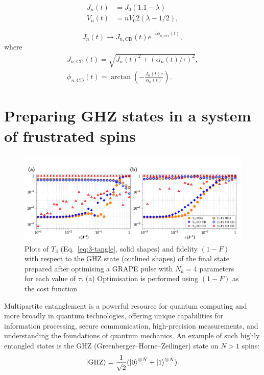 \begin{align} \label{eq:J_lattice}
    J_n(t) &= J_0(1.1 - \lambda) \\ \label{eq:V_lattice}
    V_n(t) &= n V_0 2 (\lambda - 1/2),
\end{align}

\begin{equation}\label{eq:tunneling}
    J_n(t) \rightarrow J_{n, \mathrm{CD}}(t) e^{-i\phi_{n, \mathrm{CD}}(t)},
\end{equation}
where
\begin{align}\label{eq:J_cd}
    J_{n, \mathrm{CD}}(t) = \sqrt{J_n(t)^2 + (\alpha_n(t)/\tau)^2}, \\ \label{eq:phi_cd}
    \phi_{n, \mathrm{CD}}(t)  = \arctan\left(-\frac{J_n(t)\tau}{\alpha_n(t)}\right),
\end{align}

\section{Preparing GHZ states in a system of frustrated spins}\label{sec:6.4_ghz_states}

\begin{figure}[t]
    \centering
    \includegraphics[width=\linewidth]{images/tangle_plots.jpg} \caption[Plots of entanglement and fidelity of GHZ states]{Plots of $T_3$ (Eq.~\eqref{eq:3-tangle}, solid shapes) and fidelity $(1 - F)$ with respect to the GHZ state (outlined shapes) of the final state prepared after optimising a GRAPE pulse with $N_k = 4$ parameters for each value of $\tau$.  (a) Optimisation is performed using $(1 - F)$ as the cost function}\label{fig:tangle_v_fidelity}
\end{figure}

Multipartite entanglement is a powerful resource for quantum computing and more broadly in quantum technologies, offering unique capabilities for information processing, secure communication, high-precision measurements, and understanding the foundations of quantum mechanics. An example of such highly entangled states is the GHZ (Greenberger–Horne–Zeilinger) state \cite{greenberger_bells_1990} on $N > 1$ spins:
\begin{equation}\label{eq:GHZ_state}
    \ket{\rm GHZ} = \frac{1}{\sqrt{2}} (\ket{0}^{\otimes N} + \ket{1}^{\otimes N}).
\end{equation}

